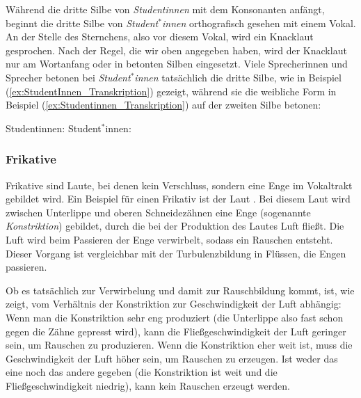 \ea
\ea \label{ex:StudentInnen} 
   
\ex {}   
\z
\z

Während die dritte Silbe von \textit{Studentinnen} mit dem Konsonanten \textipa{[t]} anfängt, beginnt die dritte Silbe von \textit{Student$^\ast$innen} orthografisch gesehen mit einem Vokal. An der Stelle des Sternchens, also vor diesem Vokal, wird ein Knacklaut gesprochen. Nach der Regel, die wir oben angegeben haben, wird der Knacklaut nur am Wortanfang oder in betonten Silben eingesetzt. Viele Sprecherinnen und Sprecher betonen bei \textit{Student$^\ast$innen} tatsächlich die dritte Silbe,  wie in Beispiel (\ref{ex:StudentInnen_Transkription}) gezeigt, während sie die weibliche Form in Beispiel (\ref{ex:Studentinnen_Transkription}) auf der zweiten Silbe betonen:

\ea
\ea \label{ex:Studentinnen_Transkription} 
Studentinnen: 
\ex \label{ex:StudentInnen_Transkription} Student$^\ast$innen: 
\z
\z



\subsubsection{Frikative}\label{subsubsection:Frikative}
Frikative sind Laute, bei denen kein Verschluss, sondern eine Enge im Vokaltrakt gebildet wird. Ein Beispiel für einen Frikativ ist der Laut \textipa{[f]}. Bei diesem Laut wird zwischen Unterlippe und oberen Schneidezähnen eine Enge (sogenannte \textit{Konstriktion}) gebildet, durch die bei der Produktion des Lautes Luft fließt. Die Luft wird beim Passieren der Enge verwirbelt, sodass ein Rauschen entsteht. Dieser Vorgang ist vergleichbar mit der Turbulenzbildung in Flüssen, die Engen passieren.

Ob es tatsächlich zur Verwirbelung und damit zur Rauschbildung kommt, ist, wie \citet{Shadle85} zeigt, vom Verhältnis der Konstriktion zur Geschwindigkeit der Luft abhängig: Wenn man die Konstriktion sehr eng produziert (die Unterlippe also fast schon gegen die Zähne gepresst wird), kann die Fließgeschwindigkeit der Luft geringer sein, um Rauschen zu produzieren. Wenn die Konstriktion eher weit ist, muss die Geschwindigkeit der Luft höher sein, um Rauschen zu erzeugen. Ist weder das eine noch das andere gegeben (die Konstriktion ist weit und die Fließgeschwindigkeit niedrig), kann kein Rauschen erzeugt werden.

